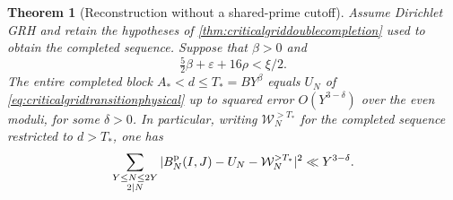 \documentclass[11pt,a4paper]{article}
\numberwithin{equation}{section}
\newtheorem{theorem}{Theorem}[section]
\begin{document}
\begin{theorem}[Reconstruction without a shared-prime cutoff]
\label{thm:criticalgriduncappedtransition}
Assume Dirichlet GRH and retain the hypotheses of
\cref{thm:criticalgriddoublecompletion} used to obtain the
completed sequence. Suppose that $\beta>0$ and
\begin{equation}
 \tfrac52\beta+\varepsilon+16\rho<\xi/2 .
 \label{eq:criticalgriduncappedcondition}
\end{equation}
The entire completed block $A_*<d\le T_*=BY^\beta$
equals $U_N$ of \cref{eq:criticalgridtransitionphysical}
up to squared error $O(Y^{3-\delta})$ over the even moduli,
for some $\delta>0$. In particular, writing $\mathcal W_N^{>T_*}$
for the completed sequence restricted to $d>T_*$, one has
\begin{equation}
 \sum_{\substack{Y\le N\le 2Y\\2\mid N}}
 |B_N^{\rm p}(I,J)-U_N-\mathcal W_N^{>T_*}|^2
 \ll Y^{3-\delta}.
 \label{eq:criticalgriduncappedreduction}
\end{equation}
\end{theorem}
\end{document}
